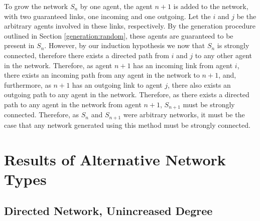 \documentclass[a4paper, 12pt]{report}
\begin{document}
To grow the network $S_n$ by one agent, the agent $n+1$ is added to the network, with two guaranteed links, one incoming and one outgoing. Let the $i$ and $j$ be the arbitrary agents involved in these links, respectively. By the generation procedure outlined in Section \ref{generation:random}, these agents are guaranteed to be present in $S_n$. However, by our induction hypothesis we now that $S_n$ is strongly connected, therefore there exists a directed path from $i$ and $j$ to any other agent in the network. Therefore, as agent $n+1$ has an incoming link from agent $i$, there exists an incoming path from any agent in the network to $n+1$, and, furthermore, as $n+1$ has an outgoing link to agent $j$, there also exists an outgoing path to any agent in the network. Therefore, as there exists a directed path to any agent in the network from agent $n+1$, $S_{n+1}$ must be strongly connected.\newline
Therefore, as $S_n$ and $S_{n+1}$ were arbitrary networks, it must be the case that any network generated using this method must be strongly connected.\newline

\section{Results of Alternative Network Types}
\label{results:appendix}
\newpage

\subsection{Directed Network, Unincreased Degree}
\end{document}
